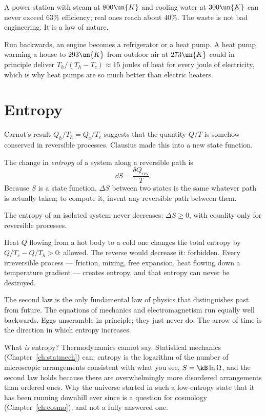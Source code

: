 A power station with steam at $800\un{K}$ and cooling water at $300\un{K}$ can never exceed $63\%$ efficiency; real ones reach about $40\%$. The waste is not bad engineering. It is a law of nature.

Run backwards, an engine becomes a refrigerator or a heat pump. A heat pump warming a house to $293\un{K}$ from outdoor air at $273\un{K}$ could in principle deliver $T_h/(T_h - T_c)\approx 15$ joules of heat for every joule of electricity, which is why heat pumps are so much better than electric heaters.

\section{Entropy}

Carnot's result $Q_h/T_h = Q_c/T_c$ suggests that the quantity $Q/T$ is somehow conserved in reversible processes. Clausius made this into a new state function.

\begin{definition}[Entropy]
The change in \emph{entropy} of a system along a reversible path is
\[
  \dd S = \frac{\delta Q_{\text{rev}}}{T}.
\]
Because $S$ is a state function, $\Delta S$ between two states is the same whatever path is actually taken; to compute it, invent any reversible path between them.
\end{definition}

\begin{law}
The entropy of an isolated system never decreases: $\Delta S\ge0$, with equality only for reversible processes.
\end{law}

Heat $Q$ flowing from a hot body to a cold one changes the total entropy by $Q/T_c - Q/T_h > 0$: allowed. The reverse would decrease it: forbidden. Every irreversible process --- friction, mixing, free expansion, heat flowing down a temperature gradient --- creates entropy, and that entropy can never be destroyed.

\begin{keyidea}
The second law is the only fundamental law of physics that distinguishes past from future. The equations of mechanics and electromagnetism run equally well backwards. Eggs unscramble in principle; they just never do. The arrow of time is the direction in which entropy increases.
\end{keyidea}

What \emph{is} entropy? Thermodynamics cannot say. Statistical mechanics (Chapter~\ref{ch:statmech}) can: entropy is the logarithm of the number of microscopic arrangements consistent with what you see, $S = \kB\ln\Omega$, and the second law holds because there are overwhelmingly more disordered arrangements than ordered ones. Why the universe started in such a low-entropy state that it has been running downhill ever since is a question for cosmology (Chapter~\ref{ch:cosmo}), and not a fully answered one.

